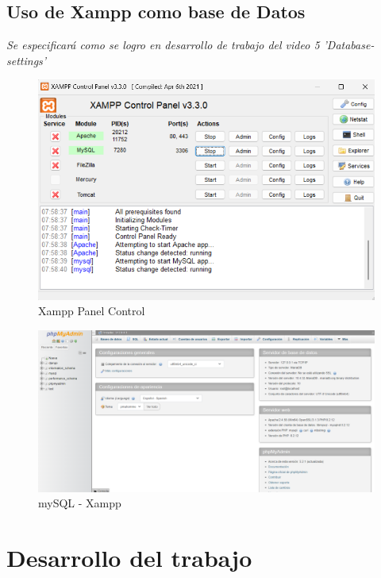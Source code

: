 \documentclass{article}
\begin{document}

  \subsection{Uso de Xampp como base de Datos}
    \textit{Se especificará como se logro en desarrollo de trabajo del video 5 'Database-settings'}
    \begin{figure}[H]
      \centering
      \includegraphics[width=1\textwidth, keepaspectratio]{img/xampp1.png}
      \caption{Xampp Panel Control}
    \end{figure}
    \begin{figure}[H]
      \centering
      \includegraphics[width=1\textwidth, keepaspectratio]{img/xampp2.png}
      \caption{mySQL - Xampp}
    \end{figure}


  \section{Desarrollo del trabajo}
  
\end{document}
